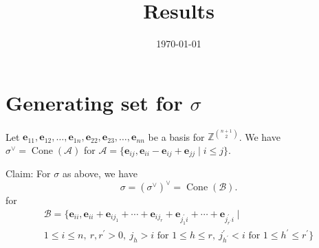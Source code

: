 \documentclass[12pt]{amsart}
\title{Results}
\date{\today}
\newcommand{\vect}[1]{\mathbf{#1}}
\DeclareMathOperator{\Cone}{Cone}
\theoremstyle{plain}
\theoremstyle{definition}
\theoremstyle{remark}
\begin{document}
\maketitle

\section{Generating set for $\sigma$}
Let $\vect e_{11}, \vect e_{12},\dots, \vect e_{1n}, \vect e_{22}, \vect e_{23}, \dots, \vect e_{nn}$ be a basis for $\mathbb{Z}^{\binom{n+1}{2}}$. We have $\sigma^\vee = \Cone(\mathscr{A})$ for $\mathscr{A} = \{\vect e_{ij}, \vect e_{ii} - \vect e_{ij} + \vect e_{jj}\mid i\leq j\}$.

Claim: For $\sigma$ as above, we have \[\sigma = (\sigma^\vee)^\vee = \Cone(\mathscr{B}).\] for \begin{multline*}
    \mathscr{B} = \{\vect e_{ii}, \vect e_{ii} + \vect e_{ij_1} + \cdots + \vect e_{ij_r} + \vect e_{j^\prime_1i} + \cdots + \vect e_{j^\prime_{r^\prime}i}\mid \\ 1\leq i\leq n,~ r,r^\prime >0,~ j_h>i \text{ for } 1\leq h \leq r,~ j^\prime_{h^\prime}< i\text{ for } 1\leq h^\prime\leq r^\prime\}
\end{multline*}
\end{document}
